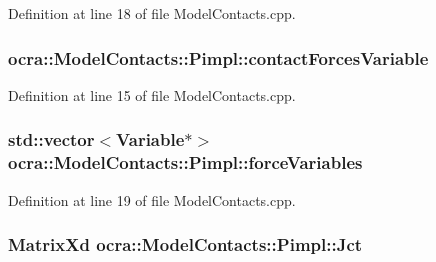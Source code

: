 Definition at line 18 of file Model\+Contacts.\+cpp.

\subsubsection[{\texorpdfstring{contact\+Forces\+Variable}{contactForcesVariable}}]{ ocra\+::\+Model\+Contacts\+::\+Pimpl\+::contact\+Forces\+Variable}\hypertarget{structocra_1_1ModelContacts_1_1Pimpl_a274e86267cd0b9dba8105fda27fda205}{}\label{structocra_1_1ModelContacts_1_1Pimpl_a274e86267cd0b9dba8105fda27fda205}


Definition at line 15 of file Model\+Contacts.\+cpp.

\subsubsection[{\texorpdfstring{force\+Variables}{forceVariables}}]{\setlength{\rightskip}{0pt plus 5cm}std\+::vector$<${\bf Variable}$\ast$$>$ ocra\+::\+Model\+Contacts\+::\+Pimpl\+::force\+Variables}\hypertarget{structocra_1_1ModelContacts_1_1Pimpl_a133837a5c20241ac20b41c0fb7401682}{}\label{structocra_1_1ModelContacts_1_1Pimpl_a133837a5c20241ac20b41c0fb7401682}


Definition at line 19 of file Model\+Contacts.\+cpp.

\subsubsection[{\texorpdfstring{Jct}{Jct}}]{\setlength{\rightskip}{0pt plus 5cm}Matrix\+Xd ocra\+::\+Model\+Contacts\+::\+Pimpl\+::\+Jct}\hypertarget{structocra_1_1ModelContacts_1_1Pimpl_ae11aa9cbd6a04aebd3039556c3da027b}{}\label{structocra_1_1ModelContacts_1_1Pimpl_ae11aa9cbd6a04aebd3039556c3da027b}


